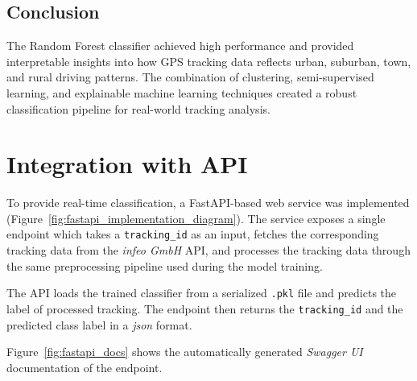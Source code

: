 \documentclass[a4paper,12pt,twoside]{scrreprt}
\begin{document}


\subsection{Conclusion}

The Random Forest classifier achieved high performance and provided
interpretable insights into how GPS tracking data reflects urban, suburban,
town, and rural driving patterns. The combination of clustering,
semi-supervised learning, and explainable machine learning techniques created a
robust
classification pipeline for real-world tracking analysis.

\section{Integration with API}

To provide real-time classification, a FastAPI-based web service was
implemented (Figure~\ref{fig:fastapi_implementation_diagram}). The service
exposes a single endpoint which takes a
\texttt{tracking\_id} as an input, fetches the corresponding tracking data from
the \textit{infeo GmbH} API, and processes the tracking data through the same
preprocessing pipeline used during the model training.

The API loads the trained classifier from a serialized \texttt{.pkl} file and
predicts the label of processed tracking.
The endpoint then returns the \texttt{tracking\_id} and the predicted class
label in a \textit{json} format.

Figure~\ref{fig:fastapi_docs} shows the automatically generated \textit{Swagger
  UI} documentation of the endpoint.
\end{document}
